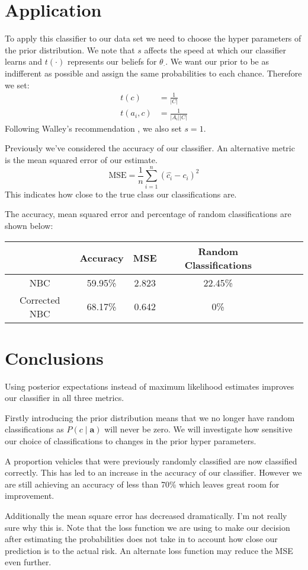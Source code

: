 \section{Application}

To apply this classifier to our data set we need to choose the hyper parameters of the prior distribution.
We note that $s$ affects the speed at which our classifier learns and $t(\cdot)$ represents our beliefs for $\theta_\cdot$.
We want our prior to be as indifferent as possible and assign the same probabilities to each chance. Therefore we set:
\begin{align}\label{initial prior}
	t(c) & = \frac{1}{|C|} \\
	t(a_i, c) & = \frac{1}{|A_i||C|}
\end{align}
Following Walley's recommendation \cite{Walley96}, we also set $s=1$.

Previously we've considered the accuracy of our classifier.
An alternative metric is the mean squared error of our estimate.
\begin{equation}
	\text{MSE} = \frac{1}{n}\sum_{i=1}^n(\hat{c_i} - c_i)^2
\end{equation}
This indicates how close to the true class our classifications are.

The accuracy, mean squared error and percentage of random classifications are shown below:
\begin{center}
	\begin{tabular}{ c|c c c c c c }
		              & Accuracy & MSE   & Random Classifications\\
		\hline
		NBC           & 59.95\%  & 2.823 & 22.45\% \\
		Corrected NBC & 68.17\%  & 0.642 & 0\%
	\end{tabular}
\end{center}

\section{Conclusions}
Using posterior expectations instead of maximum likelihood estimates improves our classifier in all three metrics.

Firstly introducing the prior distribution means that we no longer have random classifications as $P(c \mid \mathbf{a})$ will never be zero.
We will investigate how sensitive our choice of classifications to changes in the prior hyper parameters.

A proportion vehicles that were previously randomly classified are now classified correctly.
This has led to an increase in the accuracy of our classifier.
However we are still achieving an accuracy of less than 70\% which leaves great room for improvement.

Additionally the mean square error has decreased dramatically.
I'm not really sure why this is.
Note that the loss function we are using to make our decision after estimating the probabilities does not take in to account how close our prediction is to the actual risk.
An alternate loss function may reduce the MSE even further.